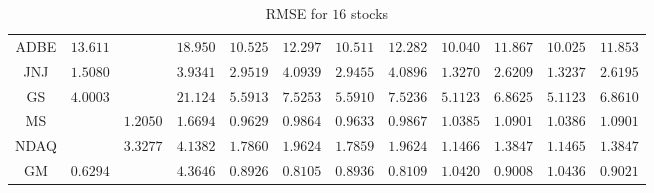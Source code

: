 \documentclass[12pt, A4]{article}
\begin{document}
\begin{landscape}
\begin{table}[H]
\begin{center}
\begin{tabular}{| c | c | c | c | c | c | c | c | c | c | c | c |}
				ADBE & $13.611$ & \cellcolor{blue!25}  \boldmath{$4.6999$} & $18.950$ & $10.525$ & $12.297$ & $10.511$ & $12.282$ & $10.040$ & $11.867$ & $10.025$ & $11.853$\\ \cline{1-12}
				JNJ & $1.5080$ & \cellcolor{blue!25} \boldmath{$1.1533$} & $3.9341$ & $2.9519$ & $4.0939$ & $2.9455$ & $4.0896$ & $1.3270$ & $2.6209$ & $1.3237$ & $2.6195$\\ \cline{1-12}
				GS & $4.0003$ & \cellcolor{blue!25}  \boldmath{$3.5884$} & $21.124$ & $5.5913$ & $7.5253$ & $5.5910$ & $7.5236$ & $5.1123$ & $6.8625$ & $5.1123$ & $6.8610$\\ \cline{1-12}
				MS &  \cellcolor{blue!25}  \boldmath{$0.6903$} & $1.2050$ & $1.6694$ & $0.9629$ & $0.9864$ & $0.9633$ & $0.9867$ & $1.0385$ & $1.0901$ & $1.0386$ & $1.0901$\\ \cline{1-12}
				NDAQ &\cellcolor{blue!25}  \boldmath{$0.9562$} & $3.3277$ & $4.1382$ & $1.7860$ & $1.9624$ & $1.7859$ & $1.9624$ & $1.1466$ & $1.3847$ & $1.1465$ & $1.3847$\\ \cline{1-12}
				GM & $0.6294$ & \cellcolor{blue!25}  \boldmath{$0.5731$} & $4.3646$ & $0.8926$ & $0.8105$ & $0.8936$ & $0.8109$ & $1.0420$ & $0.9008$ & $1.0436$ & $0.9021$\\ \cline{1-12}
			\end{tabular}
			\caption{RMSE for $16$ stocks} \label{stocks RMSE_results}
		\end{center}
	\end{table}
\end{landscape}
\end{document}
